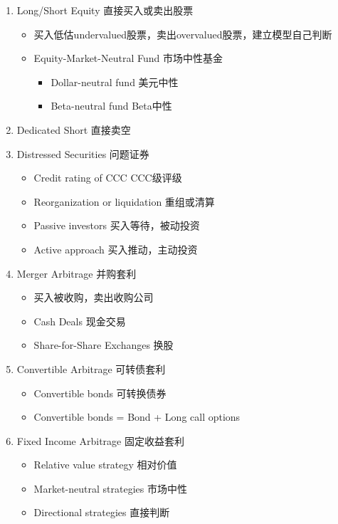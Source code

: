 \documentclass[a4paper,6pt,twoside,openany]{article}
\begin{document}
\begin{itemize}
\begin{itemize}
    \begin{enumerate}
    \item Long/Short Equity 直接买入或卖出股票
      \begin{itemize}
      \item 买入低估undervalued股票，卖出overvalued股票，建立模型自己判断
      \item Equity-Market-Neutral Fund 市场中性基金
        \begin{itemize}
	\item Dollar-neutral fund 美元中性
        \item Beta-neutral fund Beta中性
        \end{itemize}
      \end{itemize}
    \item Dedicated Short 直接卖空
    \item Distressed Securities 问题证券
      \begin{itemize}
      \item Credit rating of CCC CCC级评级
      \item Reorganization or liquidation 重组或清算
      \item Passive investors 买入等待，被动投资
      \item Active approach 买入推动，主动投资
      \end{itemize}
    \item Merger Arbitrage 并购套利
      \begin{itemize}
      \item 买入被收购，卖出收购公司
      \item Cash Deals 现金交易
      \item Share-for-Share Exchanges 换股
      \end{itemize}
    \item Convertible Arbitrage 可转债套利
      \begin{itemize}
      \item Convertible bonds 可转换债券
      \item Convertible bonds = Bond + Long call options
      \end{itemize}
    \item Fixed Income Arbitrage 固定收益套利
      \begin{itemize}
      \item Relative value strategy 相对价值
      \item Market-neutral strategies 市场中性
      \item Directional strategies 直接判断

\end{itemize}
\end{enumerate}
\end{itemize}
\end{itemize}
\end{document}
